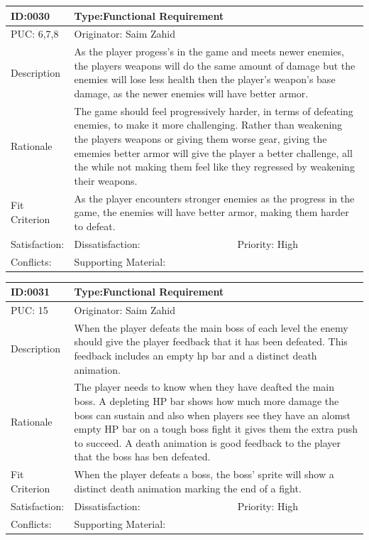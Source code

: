 \documentclass{article}
\begin{document}
	\begin{table}[H]
		\begin{tabular}{|l|l|l|}
			\hline
			ID:0030 & \multicolumn{2}{l|}{Type:Functional Requirement} \\ \hline
			PUC: 6,7,8 & \multicolumn{2}{l|}{Originator: Saim Zahid} \\ \hline
			Description & \multicolumn{2}{m{0.85\textwidth}|}{As the player progess's in the game and meets newer enemies, the players weapons will do the same amount of damage but the enemies will lose less health then the player's weapon's base damage, as the newer enemies will have better armor.} \\ \hline
			Rationale & \multicolumn{2}{m{0.85\textwidth}|}{The game should feel progressively harder, in terms of defeating enemies, to make it more challenging. Rather than weakening the players weapons or giving them worse gear, giving the ememies better armor will give the player a better challenge, all the while not making them feel like they regressed by weakening their weapons.} \\ \hline
			Fit Criterion & \multicolumn{2}{m{0.85\textwidth}|}{As the player encounters stronger enemies as the progress in the game, the enemies will have better armor, making them harder to defeat.} \\ \hline
			Satisfaction: & Dissatisfaction: & Priority: High\\ \hline
			Conflicts: & \multicolumn{2}{l|}{Supporting Material:} \\ \hline
		\end{tabular}
	\end{table}

	\begin{table}[H]
		\begin{tabular}{|l|l|l|}
			\hline
			ID:0031 & \multicolumn{2}{l|}{Type:Functional Requirement} \\ \hline
			PUC: 15 & \multicolumn{2}{l|}{Originator: Saim Zahid} \\ \hline
			Description & \multicolumn{2}{m{0.85\textwidth}|}{When the player defeats the main boss of each level the enemy should give the player feedback that it has been defeated. This feedback includes an empty hp bar and a distinct death animation.} \\ \hline
			Rationale & \multicolumn{2}{m{0.85\textwidth}|}{The player needs to know when they have deafted the main boss. A depleting HP bar shows how much more damage the boss can sustain and also when players see they have an alomst empty HP bar on a tough boss fight it gives them the extra push to succeed. A death animation is good feedback to the player that the boss has ben defeated.} \\ \hline
			Fit Criterion & \multicolumn{2}{m{0.85\textwidth}|}{When the player defeats a boss, the boss' sprite will show a distinct death animation marking the end of a fight.} \\ \hline
			Satisfaction: & Dissatisfaction: & Priority: High\\ \hline
			Conflicts: & \multicolumn{2}{l|}{Supporting Material:} \\ \hline
		\end{tabular}
	\end{table}
\end{document}
